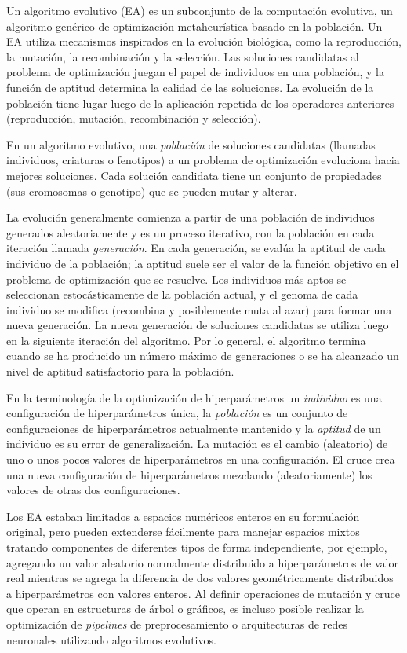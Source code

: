 Un algoritmo evolutivo (EA) es un subconjunto de la computación evolutiva, un algoritmo genérico de optimización metaheurística basado en la población. Un EA utiliza mecanismos inspirados en la evolución biológica, como la reproducción, la mutación, la recombinación y la selección. Las soluciones candidatas al problema de optimización juegan el papel de individuos en una población, y la función de aptitud determina la calidad de las soluciones. La evolución de la población tiene lugar luego de la aplicación repetida de los operadores anteriores (reproducción, mutación, recombinación y selección).

En un algoritmo evolutivo, una \textit{población} de soluciones candidatas (llamadas individuos, criaturas o fenotipos) a un problema de optimización evoluciona hacia mejores soluciones. Cada solución candidata tiene un conjunto de propiedades (sus cromosomas o genotipo) que se pueden mutar y alterar.

La evolución generalmente comienza a partir de una población de individuos generados aleatoriamente y es un proceso iterativo, con la población en cada iteración llamada \textit{generación}. En cada generación, se evalúa la aptitud de cada individuo de la población; la aptitud suele ser el valor de la función objetivo en el problema de optimización que se resuelve. Los individuos más aptos se seleccionan estocásticamente de la población actual, y el genoma de cada individuo se modifica (recombina y posiblemente muta al azar) para formar una nueva generación. La nueva generación de soluciones candidatas se utiliza luego en la siguiente iteración del algoritmo. Por lo general, el algoritmo termina cuando se ha producido un número máximo de generaciones o se ha alcanzado un nivel de aptitud satisfactorio para la población.

En la terminología de la optimización de hiperparámetros un \textit{individuo} es una configuración de hiperparámetros única, la \textit{población} es un conjunto de configuraciones de hiperparámetros actualmente mantenido y la \textit{aptitud} de un individuo es su error de generalización. La mutación es el cambio (aleatorio) de uno o unos pocos valores de hiperparámetros en una configuración. El cruce crea una nueva configuración de hiperparámetros mezclando (aleatoriamente) los valores de otras dos configuraciones.

Los EA estaban limitados a espacios numéricos enteros en su formulación original, pero pueden extenderse fácilmente para manejar espacios mixtos tratando componentes de diferentes tipos de forma independiente, por ejemplo, agregando un valor aleatorio normalmente distribuido a hiperparámetros de valor real mientras se agrega la diferencia de dos valores geométricamente distribuidos a hiperparámetros con valores enteros. Al definir operaciones de mutación y cruce que operan en estructuras de árbol o gráficos, es incluso posible realizar la optimización de \emph{pipelines} de preprocesamiento o arquitecturas de redes neuronales utilizando algoritmos evolutivos.

